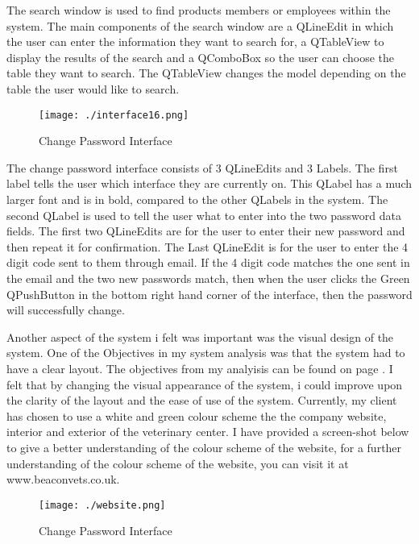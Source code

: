 The search window is used to find products members or employees within the system. The main components of the search window are a QLineEdit in which the user can enter the information they want to search for, a QTableView to display the results of the search and a QComboBox so the user can choose the table they want to search. The QTableView changes the model depending on the table the user would like to search.

\begin{figure}[H]
    \texttt{[image: ./interface16.png]}
    \caption{Change Password Interface} \label{fig:change-password-interface}
\end{figure}

The change password interface consists of 3 QLineEdits and 3 Labels. The first label tells the user which interface they are currently on. This QLabel has a much larger font and is in bold, compared to the other QLabels in the system. The second QLabel is used to tell the user what to enter into the two password data fields. The first two QLineEdits are for the user to enter their new password and then repeat it for confirmation. The Last QLineEdit is for the user to enter the 4 digit code sent to them through email. If the 4 digit code matches the one sent in the email and the two new passwords match, then when the user clicks the Green QPushButton in the bottom right hand corner of the interface, then the password will successfully change.

\pagebreak
\label{fig:style}
Another aspect of the system i felt was important was the visual design of the system. One of the Objectives in my system analysis was that the system had to have a clear layout. The objectives from my analyisis can be found on page \pageref{ref:objectives}. I felt that by changing the visual appearance of the system, i could improve upon the clarity of the layout and the ease of use of the system. Currently, my client has chosen to use a white and green colour scheme the the company website, interior and exterior of the veterinary center. I have provided a screen-shot below to give a better understanding of the colour scheme of the website, for a further understanding of the colour scheme of the website, you can visit it at www.beaconvets.co.uk.

\begin{figure}[H]
    \texttt{[image: ./website.png]}
    \caption{Change Password Interface} \label{fig:website.}
\end{figure}

